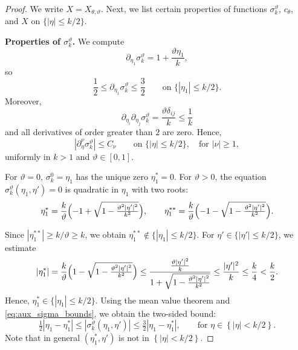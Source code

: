\documentclass[10pt,a4paper]{amsart}
\begin{document}
\begin{proof}
We write $X=X_{\theta,\vartheta}$. Next, we list certain properties of functions $\sigma_k^\vartheta$, $c_\theta$, and $X$ on $\{|\eta|\leq k/2\}$.


\textbf{Properties of $\sigma_k^\vartheta$.}
We compute
\begin{equation*}
    \partial_{\eta_1}\sigma_k^\vartheta = 1+ \frac{\vartheta\eta_1}{k},
\end{equation*}
so
\begin{equation}\label{eq:aux_sigma_bounds}
  \frac{1}{2}\leq \partial_{\eta_1}\sigma_k^\vartheta\le\frac{3}{2}
  \qquad
  \text{on }\{|\eta_1|\leq k/2\}.
\end{equation}
Moreover,
\begin{equation*}
    \partial_{\eta_i}\partial_{\eta_j}\sigma_k^\vartheta = \frac{\vartheta\delta_{ij}}{k} \leq \frac{1}{k}
\end{equation*}
and all derivatives of order greater than $2$ are zero. Hence,
\begin{equation}\label{eq:aux_sigma_allderivs}
  |\partial_\eta^\nu\sigma_k^\vartheta|\leq C_\nu
  \qquad\text{on }\{|\eta|\leq k/2\},\quad\text{for }|\nu|\geq 1,
\end{equation}
uniformly in $k> 1$ and $\vartheta\in[0,1]$.

For $\vartheta=0$, $\sigma_k^0=\eta_1$ has the unique zero $\eta_1^*=0$.
For $\vartheta>0$, the equation $\sigma_k^\vartheta(\eta_1,\eta')=0$
is quadratic in $\eta_1$ with two roots:
\begin{equation*}
    \eta_1^*=\frac{k}{\vartheta}\Bigl(-1+\sqrt{1-\tfrac{\vartheta^2|\eta'|^2}{k^2}}\Bigr),
  \qquad
  \eta_1^{**}=\frac{k}{\vartheta}\Bigl(-1-\sqrt{1-\tfrac{\vartheta^2|\eta'|^2}{k^2}}\Bigr).
\end{equation*}

Since $|\eta_1^{**}|\geq k/\vartheta\geq k$, we obtain $\eta_1^{**} \notin \{|\eta_1|\leq k/2\}$. For $\eta' \in \{|\eta'|\leq k/2\}$, we estimate
\begin{equation}\label{eq:aux_eta1star}
    |\eta_1^*|=\frac{k}{\vartheta}\Bigl(1-\sqrt{1-\tfrac{\vartheta^2|\eta'|^2}{k^2}}\Bigr) \leq \frac{\frac{\vartheta|\eta'|^2}{k}}{1+\sqrt{1-\tfrac{\vartheta^2|\eta'|^2}{k^2}}} \leq \frac{|\eta'|^2}{k} \leq \frac{k}{4} < \frac{k}{2}.
\end{equation}
Hence, $\eta_1^* \in \{|\eta_1|\leq k/2\}$. Using the mean value theorem and \eqref{eq:aux_sigma_bounds}, we obtain the two-sided bound:
\begin{equation}\label{eq:aux_sigma_two_sided}
  \tfrac{1}{2}|\eta_1-\eta_1^*|
  \le|\sigma_k^\vartheta(\eta_1,\eta')|
  \le\tfrac{3}{2}|\eta_1-\eta_1^*|,
  \qquad
  \text{for } \eta \in \left\{|\eta|<k/2\right\}.
\end{equation}
Note that in general $(\eta_1^*,\eta')$ is not in $\left\{|\eta|<k/2\right\}$.


\end{proof}
\end{document}
